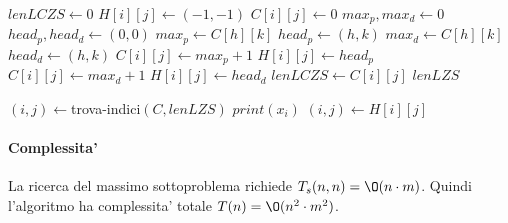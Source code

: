 \begin{algorithm}
    \begin{algorithmic}
            \State $lenLCZS \gets 0$
                    \State $H[i][j] \gets (-1, -1)$
                        \State $C[i][j] \gets 0$
                    \Else
                        \State $max_p, max_d \gets 0$
                        \State $head_p, head_d \gets (0, 0)$
                                    \State $max_p \gets C[h][k]$
                                    \State $head_p \gets (h,k)$
                                    \State $max_d \gets C[h][k]$
                                    \State $head_d \gets (h,k)$
                                \EndIf
                            \EndFor
                        \EndFor
                            \State $C[i][j] \gets max_p + 1$
                            \State $H[i][j] \gets head_p$
                        \Else
                            \State $C[i][j] \gets max_d + 1$
                            \State $H[i][j] \gets head_d$
                        \EndIf
                            \State $lenLCZS \gets C[i][j]$
                        \EndIf
                    \EndIf
                \EndFor
            \EndFor
            \State \Return $lenLZS$
        \EndProcedure
    \end{algorithmic}
\end{algorithm}

\begin{algorithm}
    \begin{algorithmic}
            \State $(i,j) \gets $trova-indici$(C, lenLZS)$
                \State $print(x_{i})$
                \State $(i,j) \gets H[i][j]$
            \EndWhile
        \EndProcedure
    \end{algorithmic}
\end{algorithm}

\paragraph{Complessita'}
La ricerca del massimo sottoproblema richiede $T_s(n, n) = \O(n \cdot m)$.
Quindi l'algoritmo ha complessita' totale $T(n) = \O(n^2 \cdot m^2)$.